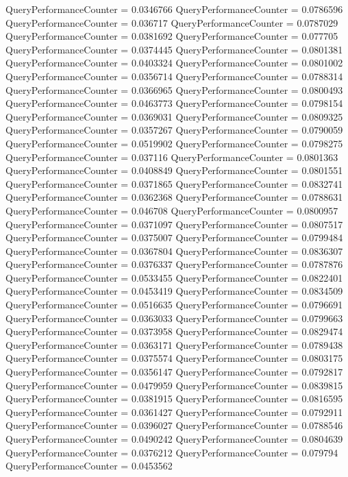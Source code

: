 \documentclass[9pt]{article}
\theoremstyle{plain}
\theoremstyle{definition}
\theoremstyle{remark}
\numberwithin{equation}{section}
\begin{document}
QueryPerformanceCounter  =  0.0346766
QueryPerformanceCounter  =  0.0786596
QueryPerformanceCounter  =  0.036717
QueryPerformanceCounter  =  0.0787029
QueryPerformanceCounter  =  0.0381692
QueryPerformanceCounter  =  0.077705
QueryPerformanceCounter  =  0.0374445
QueryPerformanceCounter  =  0.0801381
QueryPerformanceCounter  =  0.0403324
QueryPerformanceCounter  =  0.0801002
QueryPerformanceCounter  =  0.0356714
QueryPerformanceCounter  =  0.0788314
QueryPerformanceCounter  =  0.0366965
QueryPerformanceCounter  =  0.0800493
QueryPerformanceCounter  =  0.0463773
QueryPerformanceCounter  =  0.0798154
QueryPerformanceCounter  =  0.0369031
QueryPerformanceCounter  =  0.0809325
QueryPerformanceCounter  =  0.0357267
QueryPerformanceCounter  =  0.0790059
QueryPerformanceCounter  =  0.0519902
QueryPerformanceCounter  =  0.0798275
QueryPerformanceCounter  =  0.037116
QueryPerformanceCounter  =  0.0801363
QueryPerformanceCounter  =  0.0408849
QueryPerformanceCounter  =  0.0801551
QueryPerformanceCounter  =  0.0371865
QueryPerformanceCounter  =  0.0832741
QueryPerformanceCounter  =  0.0362368
QueryPerformanceCounter  =  0.0788631
QueryPerformanceCounter  =  0.046708
QueryPerformanceCounter  =  0.0800957
QueryPerformanceCounter  =  0.0371097
QueryPerformanceCounter  =  0.0807517
QueryPerformanceCounter  =  0.0375007
QueryPerformanceCounter  =  0.0799484
QueryPerformanceCounter  =  0.0367804
QueryPerformanceCounter  =  0.0836307
QueryPerformanceCounter  =  0.0376337
QueryPerformanceCounter  =  0.0787876
QueryPerformanceCounter  =  0.0533455
QueryPerformanceCounter  =  0.0822401
QueryPerformanceCounter  =  0.0453419
QueryPerformanceCounter  =  0.0834509
QueryPerformanceCounter  =  0.0516635
QueryPerformanceCounter  =  0.0796691
QueryPerformanceCounter  =  0.0363033
QueryPerformanceCounter  =  0.0799663
QueryPerformanceCounter  =  0.0373958
QueryPerformanceCounter  =  0.0829474
QueryPerformanceCounter  =  0.0363171
QueryPerformanceCounter  =  0.0789438
QueryPerformanceCounter  =  0.0375574
QueryPerformanceCounter  =  0.0803175
QueryPerformanceCounter  =  0.0356147
QueryPerformanceCounter  =  0.0792817
QueryPerformanceCounter  =  0.0479959
QueryPerformanceCounter  =  0.0839815
QueryPerformanceCounter  =  0.0381915
QueryPerformanceCounter  =  0.0816595
QueryPerformanceCounter  =  0.0361427
QueryPerformanceCounter  =  0.0792911
QueryPerformanceCounter  =  0.0396027
QueryPerformanceCounter  =  0.0788546
QueryPerformanceCounter  =  0.0490242
QueryPerformanceCounter  =  0.0804639
QueryPerformanceCounter  =  0.0376212
QueryPerformanceCounter  =  0.079794
QueryPerformanceCounter  =  0.0453562
\end{document}
